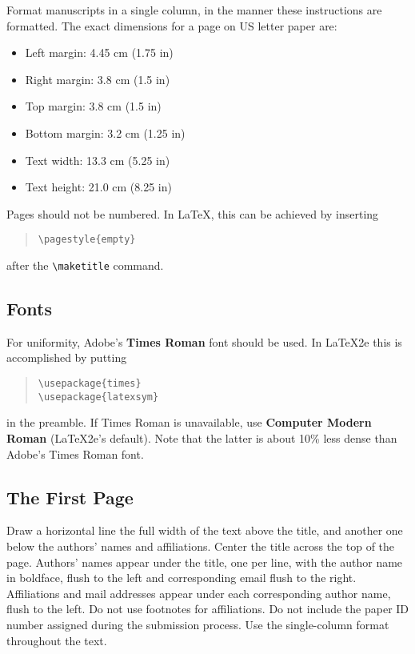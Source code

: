 \documentclass[]{article}
\begin{document}
Format manuscripts in a single column, in the manner these
instructions are formatted. The exact dimensions for a page on
US letter paper are:

\begin{itemize}
\item Left margin: 4.45 cm (1.75 in)
\item Right margin: 3.8 cm (1.5 in)
\item Top margin: 3.8 cm (1.5 in)
\item Bottom margin: 3.2 cm (1.25 in)
\item Text width: 13.3 cm (5.25 in)
\item Text height: 21.0 cm (8.25 in)
\end{itemize}

Pages should not be numbered. In LaTeX, this can be achieved by
inserting  
\begin{quote}
\begin{verbatim}
\pagestyle{empty}
\end{verbatim}
\end{quote}
after the \verb=\maketitle= command.

\subsection{Fonts}

For uniformity, Adobe's {\bf Times Roman} font should be
used. In \LaTeX2e{} this is accomplished by putting

\begin{quote}
\begin{verbatim}
\usepackage{times}
\usepackage{latexsym}
\end{verbatim}
\end{quote}
in the preamble. If Times Roman is unavailable, use {\bf Computer
  Modern Roman} (\LaTeX2e{}'s default).  Note that the latter is about
  10\% less dense than Adobe's Times Roman font.


\subsection{The First Page}
\label{ssec:first}

Draw a horizontal line the full width of the text above the title, and
another one below the authors' names and affiliations.  Center the
title across the top of the page. Authors' names appear under the
title, one per line, with the author name in boldface, flush to the
left and corresponding email flush to the right.  Affiliations and
mail addresses appear under each corresponding author name, flush to
the left. Do not use footnotes for affiliations. Do not include the
paper ID number assigned during the submission process. Use the
single-column format throughout the text.
\end{document}
